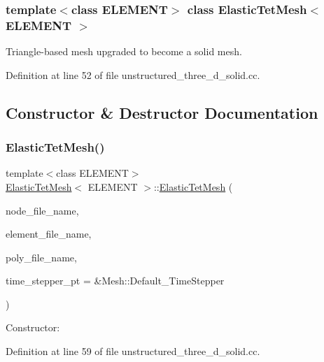 \subsubsection*{template$<$class E\+L\+E\+M\+E\+NT$>$\newline
class Elastic\+Tet\+Mesh$<$ E\+L\+E\+M\+E\+N\+T $>$}

Triangle-\/based mesh upgraded to become a solid mesh. 

Definition at line 52 of file unstructured\+\_\+three\+\_\+d\+\_\+solid.\+cc.



\subsection{Constructor \& Destructor Documentation}
\mbox{\label{classElasticTetMesh_afa0c8df37665c2b31b430de7e50dcc6b}} 
\subsubsection{\texorpdfstring{Elastic\+Tet\+Mesh()}{ElasticTetMesh()}}
{\footnotesize\ttfamily template$<$class E\+L\+E\+M\+E\+NT$>$ \\
\hyperlink{classElasticTetMesh}{Elastic\+Tet\+Mesh}$<$ E\+L\+E\+M\+E\+NT $>$\+::\hyperlink{classElasticTetMesh}{Elastic\+Tet\+Mesh} (\begin{DoxyParamCaption}\item[{const std\+::string \&}]{node\+\_\+file\+\_\+name,  }\item[{const std\+::string \&}]{element\+\_\+file\+\_\+name,  }\item[{const std\+::string \&}]{poly\+\_\+file\+\_\+name,  }\item[{Time\+Stepper $\ast$}]{time\+\_\+stepper\+\_\+pt = {\ttfamily \&Mesh\+:\+:Default\+\_\+TimeStepper} }\end{DoxyParamCaption})\hspace{0.3cm}{\ttfamily [inline]}}



Constructor\+: 



Definition at line 59 of file unstructured\+\_\+three\+\_\+d\+\_\+solid.\+cc.

\mbox{\label{classElasticTetMesh_a4d072ceb1fb8eb0d3d0f619e0221914c}} 
